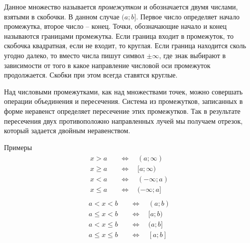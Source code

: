 \documentclass[algebra,twocolumn]{pum}
\renewcommand\le\leqslant
\renewcommand\ge\geqslant
\begin{document}
Данное множество называется \emph{промежутком} и обозначается двумя числами, взятыми в скобочки. В данном случае $(a;b]$. Первое число определяет начало промежутка, второе число -- конец. Точки, обозначающие начало и конец называются границами промежутка. Если граница входит в промежуток, то скобочка квадратная, если не входит, то круглая. Если граница находится сколь угодно далеко, то вместо числа пишут символ $\pm\infty$, где знак выбирают в зависимости от того в какое направление числовой оси промежуток продолжается. Скобки при этом всегда ставятся круглые.

Над числовыми промежутками, как над множествами точек, можно совершать операции объединения и пересечения. Система из промежутков, записанных в форме неравенст определяет пересечение этих промежутков. Так в результате пересечения двух противоположно направленных лучей мы получаем отрезок, который задается двойным неравенством.
 
\begin{pumbox2}{Примеры}
  \vspace{-0.5cm}
  \begin{gather*}
    \begin{aligned}
      x>a\quad&\Leftrightarrow\quad(a;\infty) \\
      x\ge a\quad&\Leftrightarrow\quad[a;\infty) \\
      x<a\quad&\Leftrightarrow\quad(-\infty;a) \\
      x\le a\quad&\Leftrightarrow\quad(-\infty;a]
    \end{aligned}
  \end{gather*}
  \tcblower
  \vspace{-0.5cm}
  \begin{gather*}
    \begin{aligned}
    a<x<b\quad&\Leftrightarrow\quad(a;b) \\
    a\le x < b\quad&\Leftrightarrow\quad[a;b) \\
    a< x \le b\quad&\Leftrightarrow\quad(a;b] \\
    a\le x\le b\quad&\Leftrightarrow\quad[a;b]
    \end{aligned}
  \end{gather*}
\end{pumbox2}

\end{document}
